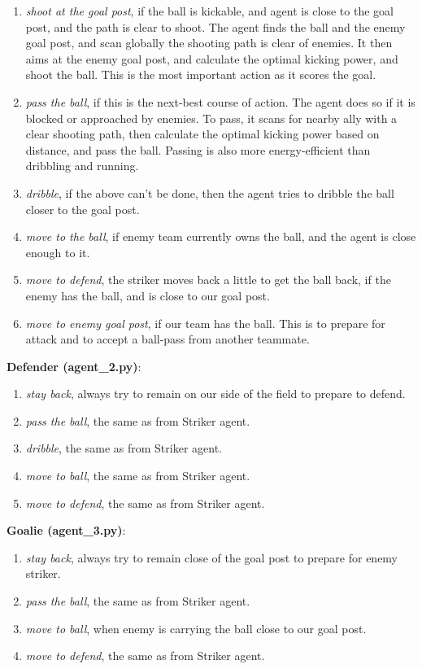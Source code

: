 \documentclass[12pt]{article}  %
\begin{document}
\begin{enumerate}
	\item \emph{shoot at the goal post}, if the ball is kickable, and agent is close to the goal post, and the path is clear to shoot. The agent finds the ball and the enemy goal post, and scan globally the shooting path is clear of enemies. It then aims at the enemy goal post, and calculate the optimal kicking power, and shoot the ball. This is the most important action as it scores the goal.
	\item \emph{pass the ball}, if this is the next-best course of action. The agent does so if it is blocked or approached by enemies. To pass, it scans for nearby ally with a clear shooting path, then calculate the optimal kicking power based on distance, and pass the ball. Passing is also more energy-efficient than dribbling and running.
	\item \emph{dribble}, if the above can't be done, then the agent tries to dribble the ball closer to the goal post.
	\item \emph{move to the ball}, if enemy team currently owns the ball, and the agent is close enough to it.
	\item \emph{move to defend}, the striker moves back a little to get the ball back, if the enemy has the ball, and is close to our goal post.
	\item \emph{move to enemy goal post}, if our team has the ball. This is to prepare for attack and to accept a ball-pass from another teammate.
\end{enumerate}


{\bf Defender (agent\_2.py)}:

\begin{enumerate}
	\item \emph{stay back}, always try to remain on our side of the field to prepare to defend.
	\item \emph{pass the ball}, the same as from Striker agent.
	\item \emph{dribble}, the same as from Striker agent.
	\item \emph{move to ball}, the same as from Striker agent.
	\item \emph{move to defend}, the same as from Striker agent.
\end{enumerate}



{\bf Goalie (agent\_3.py)}:

\begin{enumerate}
	\item \emph{stay back}, always try to remain close of the goal post to prepare for enemy striker.
	\item \emph{pass the ball}, the same as from Striker agent.
	\item \emph{move to ball}, when enemy is carrying the ball close to our goal post.
	\item \emph{move to defend}, the same as from Striker agent.
\end{enumerate}
\end{document}

